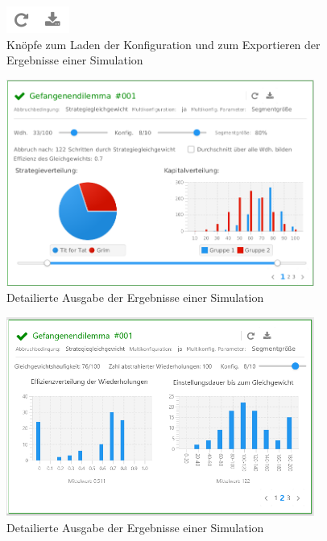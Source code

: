 \documentclass[parskip=full,11pt]{scrartcl}
\begin{document}
\begin{figure}[ht]
	\centering
	\includegraphics{images/out_btn.png}
	\caption{\label{fig:out_btn}
		Knöpfe zum Laden der Konfiguration und zum Exportieren der Ergebnisse einer Simulation}
\end{figure}
\begin{figure}[H]
	\centering
	\includegraphics[width=0.9\textwidth]{images/home_out_multi_1.png}
	\caption{\label{fig:home_out_1}
		Detailierte Ausgabe der Ergebnisse einer Simulation}
\end{figure}
\begin{figure}[H]
	\centering
	\includegraphics[width=0.9\textwidth]{images/home_out_multi_2.png}
	\caption{\label{fig:home_out_2}
		Detailierte Ausgabe der Ergebnisse einer Simulation}
\end{figure}
\end{document}
